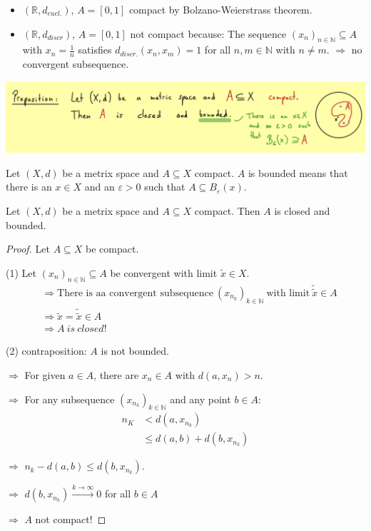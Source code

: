 \documentclass[../../note.tex]{subfiles}
\begin{document}
\begin{example}
    \begin{itemize}
        \item $(\mathbb{R},d_{eucl.})$, $A = [0,1]$ compact by Bolzano-Weierstrass theorem.
        \item $(\mathbb{R}, d_{discr})$, $A=[0,1]$ not compact because: The sequence $(x_n)_{n \in \mathbb{N}} \subseteq A$ with $x_n =\frac{1}{n}$ satisfies $d_{discr.}(x_n,x_m)=1$ for all $n,m \in \mathbb{N}$ with $n \neq m$. $\Longrightarrow$ no convergent subsequence.  
    \end{itemize}
\end{example}
\includegraphics[scale = 0.2]{../figures/def of bounded.png}
\begin{definition}[Bounded]
    Let $(X,d)$ be a metrix space and $A \subseteq X$ compact. $A$ is bounded means that there is an $x \in X$ and an $\varepsilon > 0$ such that $A \subseteq B_{\varepsilon}(x)$.
\end{definition}
\begin{proposition}
    Let $(X,d)$ be a metrix space and $A \subseteq X$ compact. Then $A$ is closed and bounded.
\end{proposition}
\begin{proof}
    Let $A \subseteq X$ be compact.

    (1) Let $(x_n)_{n \in \mathbb{N}} \subseteq A$ be convergent with limit $\tilde{x} \in X$. 
    \begin{align}
        &\Longrightarrow \textrm{There is aa convergent subsequence}~(x_{n_k})_{k \in \mathbb{N}}~\textrm{with limit}~\tilde{\tilde{x}} \in A \\
        &\Longrightarrow \tilde{x} = \tilde{\tilde{x}} \in A \\
        &\Longrightarrow A~is~closed!
    \end{align}  

    (2) contraposition: $A$ is not bounded.

    $\Longrightarrow$ For given $a \in A$, there are $x_n \in A$ with $d(a,x_n)>n$.

    $\Longrightarrow$ For any subsequence $(x_{n_k})_{k \in \mathbb{N}}$ and any point $b \in A$:
    \begin{align}
        n_K
        &< d(a,x_{n_k}) \\
        &\leq d(a,b) + d(b,x_{n_k})
    \end{align}

    $\Longrightarrow$ $n_k - d(a,b)\leq d(b, x_{n_k})$.

    $\Longrightarrow$ $d(b,x_{n_k}) \stackrel{k \rightarrow \infty}{\longrightarrow} 0$ for all $b \in A$

    $\Longrightarrow$ $A$ not compact!
\end{proof}
\end{document}
